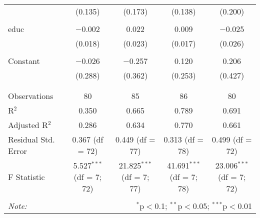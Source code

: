 \begin{table}[!htbp]
\begin{tabular}{@{\extracolsep{5pt}}lcccc}
  & (0.135) & (0.173) & (0.138) & (0.200) \\ 
  & & & & \\ 
 educ & $-$0.002 & 0.022 & 0.009 & $-$0.025 \\ 
  & (0.018) & (0.023) & (0.017) & (0.026) \\ 
  & & & & \\ 
 Constant & $-$0.026 & $-$0.257 & 0.120 & 0.206 \\ 
  & (0.288) & (0.362) & (0.253) & (0.427) \\ 
  & & & & \\ 
\hline \\[-1.8ex] 
Observations & 80 & 85 & 86 & 80 \\ 
R$^{2}$ & 0.350 & 0.665 & 0.789 & 0.691 \\ 
Adjusted R$^{2}$ & 0.286 & 0.634 & 0.770 & 0.661 \\ 
Residual Std. Error & 0.367 (df = 72) & 0.449 (df = 77) & 0.313 (df = 78) & 0.499 (df = 72) \\ 
F Statistic & 5.527$^{***}$ (df = 7; 72) & 21.825$^{***}$ (df = 7; 77) & 41.691$^{***}$ (df = 7; 78) & 23.006$^{***}$ (df = 7; 72) \\ 
\hline 
\hline \\[-1.8ex] 
\textit{Note:}  & \multicolumn{4}{r}{$^{*}$p$<$0.1; $^{**}$p$<$0.05; $^{***}$p$<$0.01} \\ 
\end{tabular} 
\end{table} 
